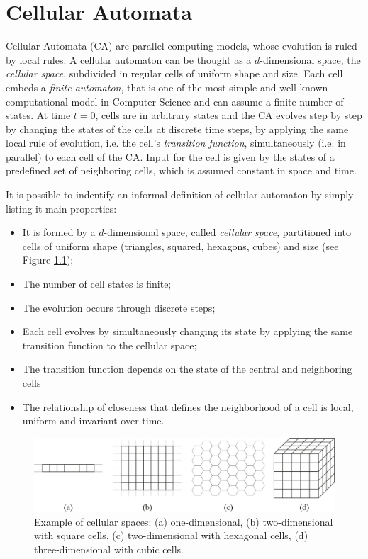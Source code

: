 \chapter{Cellular Automata}

Cellular Automata (CA) are parallel computing models, whose evolution
is ruled by local rules. A cellular automaton can be thought as a
$d$-dimensional space, the \emph{cellular space}, subdivided in
regular cells of uniform shape and size. Each cell embeds a
\emph{finite automaton}, that is one of the most simple and well known
computational model in Computer Science and can assume a finite number
of states. At time $t=0$, cells are in arbitrary states and the CA
evolves step by step by changing the states of the cells at discrete
time steps, by applying the same local rule of evolution, i.e. the
cell's \emph{transition function}, simultaneously (i.e. in parallel)
to each cell of the CA. Input for the cell is given by the states of a
predefined set of neighboring cells, which is assumed constant in
space and time.

It is possible to indentify an informal definition of cellular
automaton by simply listing it main properties:

\begin{itemize}
\item It is formed by a $d$-dimensional space, called \emph{cellular
  space}, partitioned into cells of uniform shape (triangles, squared,
  hexagons, cubes) and size (see Figure \ref{fig:CellularSpaces});
\item The number of cell states is finite;
\item The evolution occurs through discrete steps;
\item Each cell evolves by simultaneously changing its state by
  applying the same transition function to the cellular space;
\item The transition function depends on the state of the central and
  neighboring cells
\item The relationship of closeness that defines the neighborhood of a
  cell is local, uniform and invariant over time.
\end{itemize}

\begin{figure}
  \begin{center}
    \includegraphics[width=12cm]{./images/CellularAutomata/CellularSpaces}
    \caption{Example of cellular spaces: (a) one-dimensional, (b)
      two-dimensional with square cells, (c) two-dimensional with
      hexagonal cells, (d) three-dimensional with cubic cells.}
    \label{fig:CellularSpaces}
  \end{center}
\end{figure}

